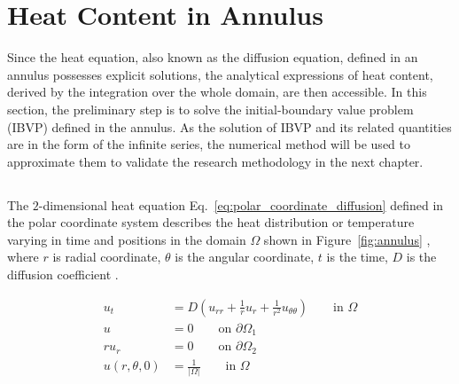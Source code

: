 
\section{Heat Content in Annulus}

Since the heat equation, also known as the diffusion equation, defined
in an annulus possesses explicit solutions, the analytical expressions
of heat content, derived by the integration over the whole domain, are
then accessible. In this section, the preliminary step is to solve the
initial-boundary value problem (IBVP) defined in the annulus. As the
solution of IBVP and its related quantities are in the form of the
infinite series, the numerical method will be used to approximate them
to validate the research methodology in the next chapter.


\subsection{}\label{analytical results}

The  $2$-dimensional heat equation \cite{crank1979mathematics}
Eq.~\ref{eq:polar_coordinate_diffusion} defined in the polar
coordinate system  describes the heat distribution or temperature
varying in time and positions in the domain $\Omega$ shown in
Figure~\ref{fig:annulus} , where $r$ is radial coordinate, $\theta$ is the angular
coordinate, $t$ is the time, $D$ is the diffusion coefficient .

\begin{align}
  u_t & = D\left(u_{rr} + \frac{1}{r} u_r + \frac{1}{r^2} u_{\theta\theta}\right)
  \qquad\text{in $\Omega$}\label{eq:polar_coordinate_diffusion} \\
  u & = 0
  \qquad\text{on $\partial \Omega_1$}\label{eq:Dirichlet_bc} \\
  ru_r & = 0
  \qquad\text{on $\partial \Omega_2$}\label{eq:Neumann_bc} \\
  u(r, \theta, 0) & = \frac{1}{|\Omega|}
  \qquad\text{in $\Omega$}\label{eq:initial_bc}  
\end{align}

